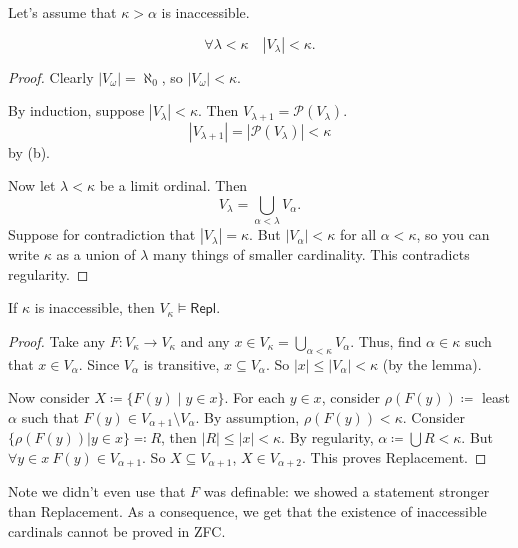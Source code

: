 \documentclass{article}
\let\models\vDash
\begin{document}
Let's assume that $\kappa > \alpha$ is inaccessible.
\begin{lemma}
  \begin{equation*}
  \forall \lambda < \kappa \quad |V_\lambda| < \kappa.
  \end{equation*}
\end{lemma}
\begin{proof}
  Clearly $|V_\omega| = \aleph_0$, so $|V_\omega| < \kappa$.

  By induction, suppose $|V_\lambda| < \kappa$. Then $V_{\lambda+1} = \mathcal{P}(V_\lambda)$.
  \begin{equation*}
  |V_{\lambda+1}| = |\mathcal{P}(V_\lambda)| < \kappa
  \end{equation*}
  by (b).

  Now let $\lambda < \kappa$ be a limit ordinal.
  Then
  \begin{equation*}
    V_\lambda = \bigcup_{\alpha < \lambda} V_\alpha.
  \end{equation*}
  Suppose for contradiction that $|V_\lambda| = \kappa$. But $|V_\alpha| < \kappa$ for all $\alpha < \kappa$, so you can write $\kappa$ as a union of $\lambda$ many things of smaller cardinality.
  This contradicts regularity.
\end{proof}

\begin{thm}
  If $\kappa$ is inaccessible, then $V_\kappa \models \textsf{Repl}.$
\end{thm}
\begin{proof}
  Take any $F: V_\kappa \to V_\kappa$ and any $x \in V_\kappa = \bigcup_{\alpha < \kappa} V_\alpha$.
  Thus, find $\alpha \in \kappa$ such that $x \in V_\alpha$.
  Since $V_\alpha$ is transitive, $x \subseteq V_\alpha$.
  So $|x| \leq |V_\alpha| < \kappa$ (by the lemma).

  Now consider $X \coloneqq \{F(y) \mid y \in x\}$.
  For each $y \in x$, consider $\rho(F(y)) \coloneqq$ least $\alpha$ such that $F(y) \in V_{\alpha+1}\setminus V_\alpha$.
  By assumption, $\rho(F(y)) < \kappa$.
  Consider $\{\rho(F(y)) | y \in x\} \eqqcolon R$, then $|R| \leq |x| < \kappa$.
  By regularity, $\alpha \coloneqq \bigcup R < \kappa$.
  But $\forall y \in x \ F(y) \in V_{\alpha+1}$.
  So $X \subseteq V_{\alpha+1}$, $X \in V_{\alpha+2}$. This proves Replacement.
\end{proof}

Note we didn't even use that $F$ was definable: we showed a statement stronger than Replacement.
As a consequence, we get that the existence of inaccessible cardinals cannot be proved in \textsf{ZFC}.
\end{document}

